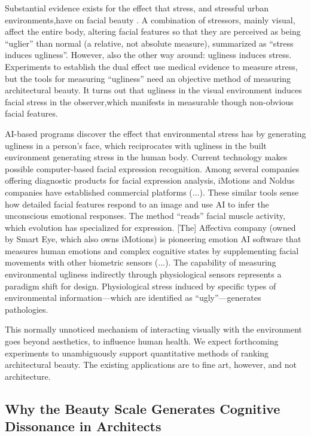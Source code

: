 \documentclass[a4paper]{article}
\begin{document}
Substantial evidence exists for the effect that stress, and stressful urban environments,have on facial beauty \cite{moore_evidence_2011}. A combination of stressors, mainly visual, affect the entire body, altering facial features so that they are perceived as being “uglier” than normal (a relative, not absolute measure), summarized as “stress induces ugliness”. However, also the other way around: ugliness induces stress. Experiments to establish the dual effect use medical evidence to measure stress, but the tools for measuring “ugliness” need an objective method of measuring architectural beauty. It turns out that ugliness in the visual environment induces facial stress in the observer,which manifests in measurable though non-obvious facial features.

AI-based programs discover the effect that environmental stress has by generating ugliness in a person’s face, which reciprocates with ugliness in the built environment generating stress in the human body. Current technology makes possible computer-based facial expression recognition. Among several companies offering diagnostic products for facial expression analysis, iMotions and Noldus companies have established commercial platforms (...). These similar tools sense how detailed facial features respond to an image and use AI to infer the unconscious emotional responses. The method “reads” facial muscle activity, which evolution has specialized for expression. [The] Affectiva company (owned by Smart Eye, which also owns iMotions) is pioneering emotion AI software that measures human emotions and complex cognitive states by supplementing facial movements with other biometric sensors (...). The capability of measuring environmental ugliness indirectly through physiological sensors represents a paradigm shift for design. Physiological stress induced by specific types of environmental information—which are identified as “ugly”—generates pathologies.

This normally unnoticed mechanism of interacting visually with the environment goes beyond aesthetics, to influence human health. We expect forthcoming experiments to unambiguously support quantitative methods of ranking architectural beauty. The existing applications are to fine art, however, and not architecture.

\subsection{Why the Beauty Scale Generates Cognitive Dissonance in Architects}
\end{document}
